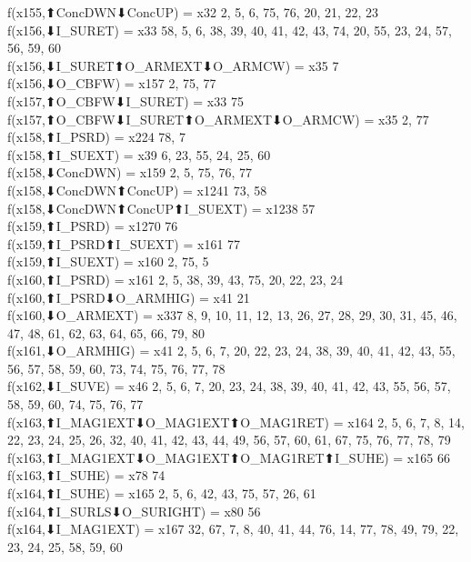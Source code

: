 f(x155,⬆ConcDWN⬇ConcUP) = x32 {2, 5, 6, 75, 76, 20, 21, 22, 23} \\
f(x156,⬇I_SURET) = x33 {58, 5, 6, 38, 39, 40, 41, 42, 43, 74, 20, 55, 23, 24, 57, 56, 59, 60} \\
f(x156,⬇I_SURET⬆O_ARMEXT⬇O_ARMCW) = x35 {7} \\
f(x156,⬇O_CBFW) = x157 {2, 75, 77} \\
f(x157,⬆O_CBFW⬇I_SURET) = x33 {75} \\
f(x157,⬆O_CBFW⬇I_SURET⬆O_ARMEXT⬇O_ARMCW) = x35 {2, 77} \\
f(x158,⬆I_PSRD) = x224 {78, 7} \\
f(x158,⬆I_SUEXT) = x39 {6, 23, 55, 24, 25, 60} \\
f(x158,⬇ConcDWN) = x159 {2, 5, 75, 76, 77} \\
f(x158,⬇ConcDWN⬆ConcUP) = x1241 {73, 58} \\
f(x158,⬇ConcDWN⬆ConcUP⬆I_SUEXT) = x1238 {57} \\
f(x159,⬆I_PSRD) = x1270 {76} \\
f(x159,⬆I_PSRD⬆I_SUEXT) = x161 {77} \\
f(x159,⬆I_SUEXT) = x160 {2, 75, 5} \\
f(x160,⬆I_PSRD) = x161 {2, 5, 38, 39, 43, 75, 20, 22, 23, 24} \\
f(x160,⬆I_PSRD⬇O_ARMHIG) = x41 {21} \\
f(x160,⬇O_ARMEXT) = x337 {8, 9, 10, 11, 12, 13, 26, 27, 28, 29, 30, 31, 45, 46, 47, 48, 61, 62, 63, 64, 65, 66, 79, 80} \\
f(x161,⬇O_ARMHIG) = x41 {2, 5, 6, 7, 20, 22, 23, 24, 38, 39, 40, 41, 42, 43, 55, 56, 57, 58, 59, 60, 73, 74, 75, 76, 77, 78} \\
f(x162,⬇I_SUVE) = x46 {2, 5, 6, 7, 20, 23, 24, 38, 39, 40, 41, 42, 43, 55, 56, 57, 58, 59, 60, 74, 75, 76, 77} \\
f(x163,⬆I_MAG1EXT⬇O_MAG1EXT⬆O_MAG1RET) = x164 {2, 5, 6, 7, 8, 14, 22, 23, 24, 25, 26, 32, 40, 41, 42, 43, 44, 49, 56, 57, 60, 61, 67, 75, 76, 77, 78, 79} \\
f(x163,⬆I_MAG1EXT⬇O_MAG1EXT⬆O_MAG1RET⬆I_SUHE) = x165 {66} \\
f(x163,⬆I_SUHE) = x78 {74} \\
f(x164,⬆I_SUHE) = x165 {2, 5, 6, 42, 43, 75, 57, 26, 61} \\
f(x164,⬆I_SURLS⬇O_SURIGHT) = x80 {56} \\
f(x164,⬇I_MAG1EXT) = x167 {32, 67, 7, 8, 40, 41, 44, 76, 14, 77, 78, 49, 79, 22, 23, 24, 25, 58, 59, 60} \\
